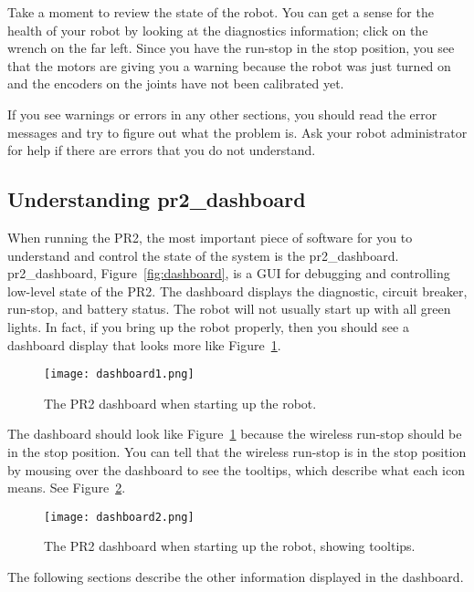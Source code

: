 Take a moment to review the state of the robot. You can get a sense for the health of 
your robot by looking at the diagnostics information; click on the wrench on the far left.  Since you have the run-stop in the
stop position, you see that the motors are giving you a warning because the robot was just turned on and the encoders on the joints have not 
been calibrated yet. 

If you see warnings or errors in any other sections, you should read the error messages and try to figure out what the 
problem is.  Ask your robot administrator for help if there are errors that you do not understand.
\subsection{Understanding pr2\_dashboard}
When running the PR2, the most important piece of software for you to understand and control the state of the system is 
the pr2\_dashboard. pr2\_dashboard, Figure~\ref{fig:dashboard}, is a GUI for debugging and controlling low-level state 
of the PR2. The dashboard displays the diagnostic, circuit breaker, run-stop, and battery status.
The robot will not usually start up with all green lights. In fact, if you bring up the robot properly, then you should see a dashboard display that looks more like Figure~\ref{fig:dashboard1}.
\begin{figure}[h]
\centering
\texttt{[image: dashboard1.png]}
\caption{The PR2 dashboard when starting up the robot.}
\label{fig:dashboard1}
\end{figure}
The dashboard should look like Figure~\ref{fig:dashboard1} because the wireless run-stop should be in the stop position.
You can tell that the wireless run-stop is in the stop position by mousing over the dashboard to see the tooltips, which describe what each icon means. See Figure~\ref{fig:dashboard2}.

\begin{figure}[h]
\centering
\texttt{[image: dashboard2.png]}
\caption{The PR2 dashboard when starting up the robot, showing tooltips.}
\label{fig:dashboard2}
\end{figure}

The following sections describe the other information displayed in the dashboard.

